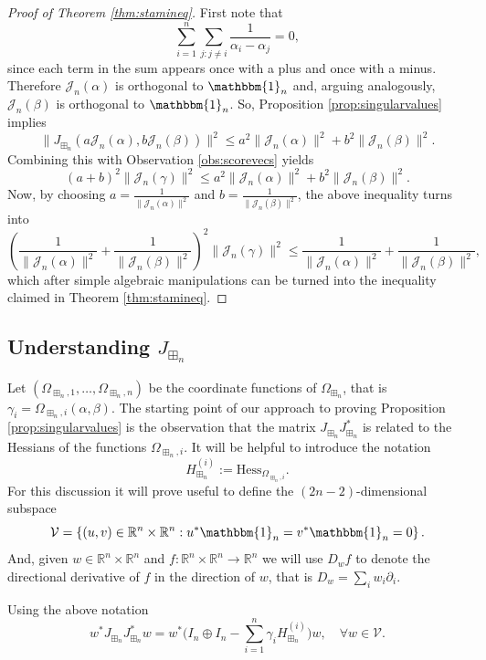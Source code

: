 \documentclass[12pt]{amsart}
\newcommand{\bR}{\mathbb{R}}
\newcommand{\calV}{\mathcal{V}}
\newcommand{\bone}{\mathbbm{1}}
\newcommand{\jac}{J_{\boxplus_n}}
\newcommand{\roots}{\Omega_{\boxplus_n}}
\newcommand{\rootsi}{\Omega_{\boxplus_n, i}}
\newcommand{\score}{\mathscr{J}_n}
\newcommand{\hessconv}{H_{\boxplus_n}^{(i)}}
\begin{document}
\begin{proof}[Proof of Theorem \ref{thm:stamineq}]
    First note that 
    $$\sum_{i=1}^n \sum_{j : j\neq i} \frac{1}{\alpha_i-\alpha_j}=0,$$
   since each term in the sum appears once with a plus and once with a minus. Therefore $\score(\alpha)$ is orthogonal to $\bone_n$ and, arguing analogously,  $\score(\beta)$ is orthogonal to $\bone_n$. So,  Proposition \ref{prop:singularvalues} implies 
   $$\|\jac(a\score(\alpha), b \score(\beta))\|^2 \leq a^2\|\score(\alpha)\|^2+b^2 \|\score(\beta)\|^2.$$
   Combining this with Observation \ref{obs:scorevecs} yields 
   $$(a+b)^2 \|\score(\gamma)\|^2 \leq a^2\|\score(\alpha)\|^2+ b^2\|\score(\beta)\|^2. $$
   Now, by choosing $a= \frac{1}{\|\score(\alpha)\|^2}$ and $b = \frac{1}{\|\score(\beta)\|^2}$, the above inequality turns into 
   $$\left(\frac{1}{\|\score(\alpha)\|^2} + \frac{1}{\|\score(\beta)\|^2} \right)^2 \|\score(\gamma)\|^2 \leq \frac{1}{\|\score(\alpha)\|^2} + \frac{1}{\|\score(\beta)\|^2}, $$
   which after simple algebraic manipulations can be turned into the inequality claimed in Theorem \ref{thm:stamineq}. 
\end{proof}


\subsection{Understanding $\jac$}
\label{sec:understandingjacob}
Let $(\Omega_{\boxplus_n, 1}, \dots, \Omega_{\boxplus_n, n})$ be the coordinate functions of $\roots$, that is $\gamma_i = \rootsi(\alpha, \beta)$. The starting point of our approach to proving Proposition \ref{prop:singularvalues} is the  observation that the matrix $\jac\jac^*$ is related to the Hessians of the functions $\rootsi$. It will be helpful to introduce the notation
$$\hessconv:= \mathrm{Hess}_{\rootsi}.$$  For this discussion it will prove useful to define the $(2n-2)$-dimensional subspace 
$$\calV = \left\{ (u, v) \in \bR^{n}\times \bR^n : u^* \bone_n = v^*\bone_n=0 \right\}. $$
And, given $w\in \bR^{n}\times \bR^n$ and $f: \bR^{n}\times \bR^n\to \bR^n$ we will use $D_wf$ to denote the directional derivative of $f$ in the direction of $w$, that is $D_w = \sum_i w_i\partial_i$.  
\begin{lemma}[The Hessian of $\roots$]
\label{lem:Hessian}
Using the above notation
    \begin{equation}
    \label{eq:Hessian}
    w^* \jac \jac^* w = w^* \Big(I_{n}\oplus I_n- \sum_{i=1}^n \gamma_i \hessconv \Big)w,\quad \forall w\in \calV. 
      \end{equation}
\end{lemma}
\end{document}
